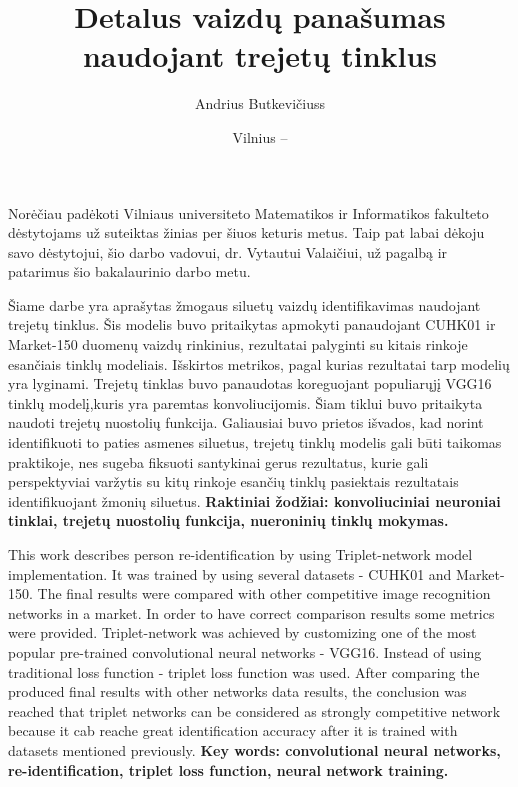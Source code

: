 \documentclass{VUMIFPSkursinis}
\title{Detalus vaizdų panašumas naudojant trejetų tinklus}
\author{Andrius Butkevičiuss}
\date{Vilnius – \the\year }
\DeclareRobustCommand{\[}{\begin{equation}}
\DeclareRobustCommand{\]}{\end{equation}}
\begin{document}
\maketitle
\thispagestyle{empty} 

\tableofcontents

\thispagestyle{empty} 
Norėčiau padėkoti Vilniaus universiteto Matematikos ir Informatikos fakulteto dėstytojams už suteiktas žinias per šiuos keturis metus. Taip pat labai dėkoju savo dėstytojui, šio darbo vadovui, dr. Vytautui Valaičiui, už pagalbą ir patarimus šio bakalaurinio darbo metu.
\pagebreak

\thispagestyle{empty} 
Šiame darbe yra aprašytas žmogaus siluetų vaizdų identifikavimas  naudojant trejetų tinklus. Šis modelis buvo pritaikytas apmokyti panaudojant CUHK01 ir Market-150 duomenų vaizdų rinkinius, rezultatai palyginti su kitais rinkoje esančiais tinklų modeliais. Išskirtos metrikos, pagal kurias rezultatai tarp modelių yra lyginami. Trejetų tinklas buvo panaudotas koreguojant populiarųjį VGG16 tinklų modelį,kuris yra paremtas konvoliucijomis. Šiam tiklui buvo pritaikyta naudoti trejetų nuostolių funkcija. Galiausiai buvo prietos išvados, kad norint identifikuoti to paties asmenes siluetus, trejetų tinklų modelis gali būti taikomas praktikoje, nes sugeba fiksuoti santykinai gerus rezultatus, kurie gali perspektyviai varžytis su kitų rinkoje esančių tinklų pasiektais rezultatais identifikuojant žmonių siluetus.
\newline
\textbf{Raktiniai žodžiai: konvoliuciniai neuroniai tinklai, trejetų nuostolių funkcija, nueroninių tinklų mokymas.}
\pagebreak

\thispagestyle{empty} 
This work describes person re-identification by using Triplet-network model implementation. It was trained by using several datasets - CUHK01 and Market-150. The final results were compared with other competitive image recognition networks in a market. In order to have correct comparison results some metrics were provided. Triplet-network was achieved by customizing one of the most popular  pre-trained convolutional neural networks - VGG16. Instead of using traditional loss function - triplet loss function was used. After comparing the produced final results with other networks data results, the conclusion was reached that triplet networks can be considered as strongly competitive network because it cab reache great identification accuracy after it is trained with datasets mentioned previously.
\newline
\textbf{Key words: convolutional neural networks, re-identification, triplet loss function, neural network training.}
\pagebreak
\end{document}
